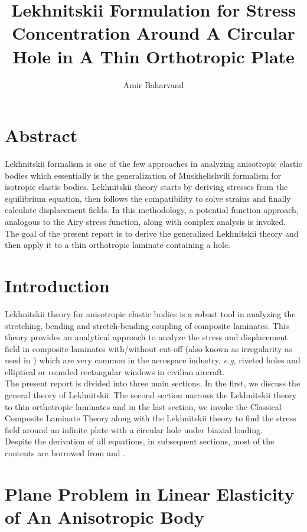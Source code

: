 \documentclass{article}
\title{Lekhnitskii Formulation for Stress Concentration Around A Circular Hole in A Thin Orthotropic Plate}
\author{Amir Baharvand }
\date{}
\begin{document}
\maketitle


\tableofcontents

\section*{Abstract}
Lekhnitskii formalism is one of the few approaches in analyzing anisotropic elastic bodies which essentially is the generalization of Muskhelishvili formalism for isotropic elastic bodies. Lekhnitskii theory starts by deriving stresses from the equilibrium equation, then follows the compatibility to solve strains and finally calculate displacement fields. In this methodology, a potential function approach, analogous to the Airy stress function, along with complex analysis is invoked. The goal of the present report is to derive the generalized Lekhnitskii theory and then apply it to a thin orthotropic laminate containing a hole.

\section{Introduction}
Lekhnitskii theory for anisotropic elastic bodies is a robust tool in analyzing the stretching, bending and stretch-bending coupling of composite laminates. This theory provides an analytical approach to analyze the stress and displacement field in composite laminates with/without cut-off (also known as irregularity as used in \cite{Koussios2009}) which are very common in the aerospace industry, \emph{e.g}, riveted holes and elliptical or rounded rectangular windows in civilian aircraft.\\

The present report is divided into three main sections. In the first, we discuss the general theory of Lekhnitskii. The second section narrows the Lekhnitskii theory to thin orthotropic laminates and in the last section, we invoke the Classical Composite Laminate Theory along with the Lekhnitskii theory to find the stress field around an infinite plate with a circular hole under biaxial loading. \\

Despite the derivation of all equations, in subsequent sections, most of the contents are borrowed from \cite{Lekhnitskii1968} and \cite{Jong1987}.
\section{Plane Problem in Linear Elasticity of An Anisotropic Body }
\end{document}
